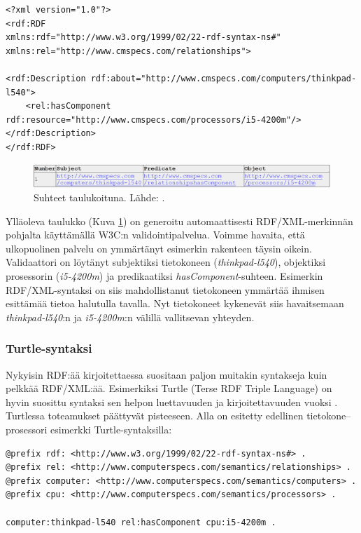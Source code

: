 \documentclass[finnish, 12pt, a4paper, elec, utf8, pdfa, online]{aaltothesis}
\begin{document}
\vskip 0.75cm
\begin{lstlisting}[style=codeblock,caption={RDF/XML syntaksiesimerkki.},captionpos=b,label={rdf_esim}]
<?xml version="1.0"?>
<rdf:RDF
xmlns:rdf="http://www.w3.org/1999/02/22-rdf-syntax-ns#"
xmlns:rel="http://www.cmspecs.com/relationships">

<rdf:Description rdf:about="http://www.cmspecs.com/computers/thinkpad-l540">
    <rel:hasComponent rdf:resource="http://www.cmspecs.com/processors/i5-4200m"/>
</rdf:Description>
</rdf:RDF>
\end{lstlisting}
\vskip 0.75cm

\begin{figure}[htb]
\centering
\includegraphics[width=15cm]{images/RDF-valid.PNG}
\caption{Suhteet taulukoituna. Lähde: \cite{W3C_RDF_validator}. \label{images/RDF-valid}}
\end{figure}

Ylläoleva taulukko (Kuva \ref{images/RDF-valid}) on generoitu automaattisesti RDF/XML-merkinnän pohjalta käyttämällä W3C:n validointipalvelua. Voimme havaita, että ulkopuolinen palvelu on ymmärtänyt esimerkin rakenteen täysin oikein. Validaattori on löytänyt subjektiksi tietokoneen (\textit{thinkpad-l540}), objektiksi prosessorin (\textit{i5-4200m}) ja predikaatiksi \textit{hasComponent}-suhteen. Esimerkin RDF/XML-syntaksi on siis mahdollistanut tietokoneen ymmärtää ihmisen esittämää tietoa halutulla tavalla. Nyt tietokoneet kykenevät siis havaitsemaan \textit{thinkpad-l540}:n ja \textit{i5-4200m}:n välillä vallitsevan yhteyden.


\subsubsection{Turtle-syntaksi}
Nykyisin RDF:ää kirjoitettaessa suositaan paljon muitakin syntakseja kuin pelkkää RDF/XML:ää. Esimerkiksi Turtle (Terse RDF Triple Language) on hyvin suosittu syntaksi sen helpon luettavuuden ja kirjoitettavuuden vuoksi \cite{cambridge2}. Turtlessa toteamukset päättyvät pisteeseen. Alla on esitetty edellinen tietokone--prosessori esimerkki Turtle-syntaksilla:

\vskip 0.75cm
\begin{lstlisting}[style=codeblock,caption={Turtle syntaksiesimerkki.},captionpos=b,label={turtle_esim}]
@prefix rdf: <http://www.w3.org/1999/02/22-rdf-syntax-ns#> .
@prefix rel: <http://www.computerspecs.com/semantics/relationships> .
@prefix computer: <http://www.computerspecs.com/semantics/computers> .
@prefix cpu: <http://www.computerspecs.com/semantics/processors> .

computer:thinkpad-l540 rel:hasComponent cpu:i5-4200m .

\end{lstlisting}
\vskip 0.75cm
\end{document}
